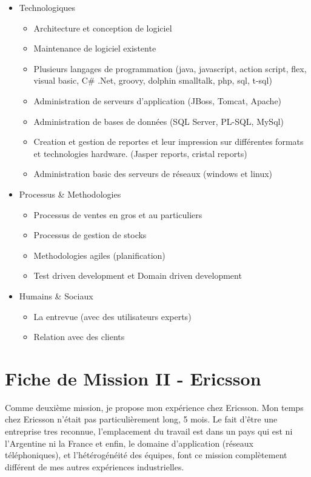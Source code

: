 \documentclass{resume} %
\begin{document}
	\begin{itemize} 				
			\item Technologiques 
					\begin{itemize}
						\item Architecture et conception de logiciel 
						\item Maintenance de logiciel existente
						\item Plusieurs langages de programmation (java, javascript, action script, flex, visual basic, C\# .Net, groovy, dolphin smalltalk, php, sql, t-sql)
						\item Administration de serveurs d'application (JBoss, Tomcat, Apache)
						\item Administration de bases de données (SQL Server, PL-SQL, MySql)
						\item Creation et gestion de reportes et leur impression sur différentes formats et technologies hardware. (Jasper reports, cristal reports)
						\item Administration basic des serveurs de réseaux (windows et linux)
					\end {itemize}
			\item Processus \& Methodologies 
					\begin{itemize}
						\item Processus de ventes en gros et au particuliers 
						\item Processus de gestion de stocks 
						\item Methodologies agiles (planification) 
						\item Test driven development et Domain driven development
					\end {itemize}
			\item  Humains \& Sociaux  
				\begin{itemize}
						\item La entrevue (avec des utilisateurs experts)
						\item Relation avec des clients
					\end {itemize}

		\end{itemize}
		




\section{Fiche de Mission II - Ericsson }
Comme deuxième mission, je propose mon expérience chez Ericsson.
Mon temps chez Ericsson n'était pas particulièrement long, 5 mois. Le fait d'être une entreprise tres reconnue,  l'emplacement du travail est dans un pays qui est ni l'Argentine ni la France et enfin,  le domaine d'application (réseaux téléphoniques), et l'hétérogénéité des équipes, font ce mission complètement différent de mes autres expériences industrielles.
\end{document}
